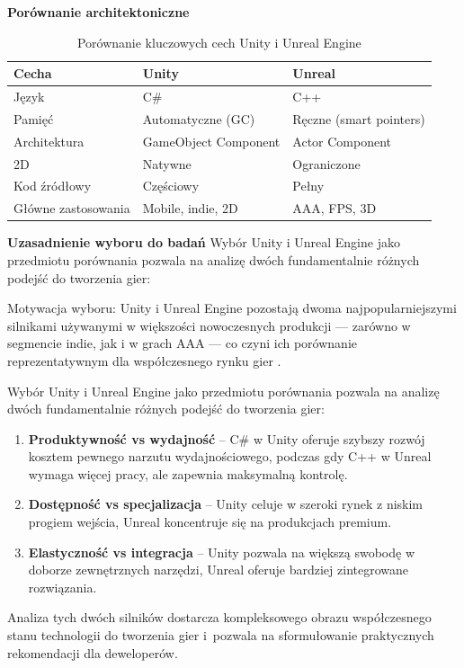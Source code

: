 \textbf{Porównanie architektoniczne}
\begin{table}[H]
\centering
\caption{Porównanie kluczowych cech Unity i Unreal Engine}
\label{tab:unity-vs-unreal}
\small
\begin{tabular}{|l|l|l|}
\hline
\textbf{Cecha} & \textbf{Unity} & \textbf{Unreal} \\
\hline
Język & C\# & C++ \\
\hline
Pamięć & Automatyczne (GC) & Ręczne (smart pointers) \\
\hline
Architektura & GameObject Component & Actor Component \\
\hline
2D & Natywne & Ograniczone \\
\hline
Kod źródłowy & Częściowy & Pełny \\
\hline
Główne zastosowania & Mobile, indie, 2D & AAA, FPS, 3D \\
\hline
\end{tabular}
\end{table}

\textbf{Uzasadnienie wyboru do badań}
Wybór Unity i Unreal Engine jako przedmiotu porównania pozwala na 
analizę dwóch fundamentalnie różnych podejść do tworzenia gier:

Motywacja wyboru: Unity i Unreal Engine pozostają dwoma najpopularniejszymi silnikami 
używanymi w większości nowoczesnych produkcji --- zarówno w segmencie indie, jak i w 
grach AAA --- co czyni ich porównanie reprezentatywnym dla współczesnego rynku gier 
\cite{vgi2025engines,g2gameengines}.

Wybór Unity i Unreal Engine jako przedmiotu porównania pozwala na 
analizę dwóch fundamentalnie różnych podejść do tworzenia gier:

\begin{enumerate}
    \item \textbf{Produktywność vs wydajność} -- C\# w Unity oferuje 
    szybszy rozwój kosztem pewnego narzutu wydajnościowego, podczas 
    gdy C++ w Unreal wymaga więcej pracy, ale zapewnia maksymalną 
    kontrolę.
    \item \textbf{Dostępność vs specjalizacja} -- Unity celuje w 
    szeroki rynek z niskim progiem wejścia, Unreal koncentruje się 
    na produkcjach premium.
    \item \textbf{Elastyczność vs integracja} -- Unity pozwala 
    na większą swobodę w doborze zewnętrznych narzędzi, Unreal 
    oferuje bardziej zintegrowane rozwiązania.
\end{enumerate}

Analiza tych dwóch silników dostarcza kompleksowego obrazu
współczesnego stanu technologii do tworzenia gier i~pozwala na
sformułowanie praktycznych rekomendacji dla deweloperów.
